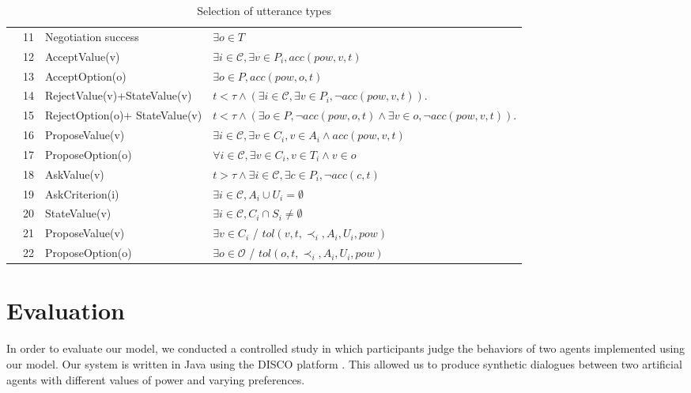 \documentclass{llncs}
\begin{document}
\begin{table}[!t]
{\begin{tabular}{|p{.3cm}|p{.6cm}|p{3cm}|p{7.5cm}|}
					\parbox[t]{2mm}{
						} & 11& Negotiation success &  $\exists o \in T$ \\
					&12& AcceptValue(v) & $\exists i\in\mathcal{C}, \exists v \in P_i, acc(pow, v, t)$ \\
					&13&AcceptOption(o) & $\exists o \in P, acc(pow, o, t)$ \\
					&14&RejectValue(v)+\newline StateValue(v) & $ t<\tau \land (\exists i\in\mathcal{C}, \exists v \in P_i, \neg acc(pow,v, t))$.\\
					&15&RejectOption(o)+ \newline StateValue(v) & $ t<\tau \land (\exists o \in P,  \neg acc(pow,o, t) \land \exists v \in o, \neg acc(pow,v, t))$.\\
					&16&ProposeValue(v) &  $\exists i\in\mathcal{C}, \exists v \in C_i, v \in A_i  \land acc(pow, v, t) $\\
					&17&ProposeOption(o)  & $\forall i\in\mathcal{C},\exists v \in C_i, v \in T_i  \land v \in o$ \\
					&18&AskValue(v) & $t > \tau \land \exists i\in\mathcal{C}, \exists c \in P_i, \neg acc(c, t)$ \\
					&19&AskCriterion(i) & $\exists i\in\mathcal{C}, A_i \cup U_i= \emptyset $\\
					&20&StateValue(v) & $\exists i\in\mathcal{C}, C_i\cap S_i \neq \emptyset$	\\
					&21& ProposeValue(v) & $\exists v \in C_i$ / $tol(v, t, \prec_i, A_i, U_i, pow)$\\
					&22& ProposeOption(o) & $\exists o \in \mathcal{O}$ / $tol(o, t, \prec_i, A_i, U_i, pow)$\\
					
					\hline
				\end{tabular}
			}
			\caption{Selection of utterance types}
			\label{table:uttChoice}
		\end{table}
		
		\section{Evaluation}
		\label{sec:evaluation}
						\vspace{-0.5em} 
		In order to evaluate our model, we conducted a controlled study in which participants judge the behaviors of two agents implemented using our model. Our system is written in Java using the DISCO platform \cite{rich09}. This allowed us to produce synthetic dialogues between two artificial agents with different values of power and varying preferences.
		
\end{document}
